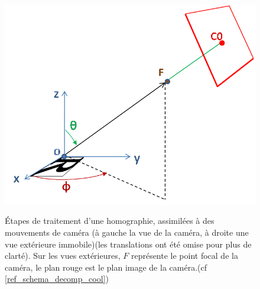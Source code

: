 \begin{figure}
{		{\includegraphics[scale=0.5]{vue_tps_hom_part.png}}}\\
		\caption{Étapes de traitement d'une homographie, assimilées à des mouvements de caméra (à gauche la vue de la caméra, à droite une vue extérieure immobile)(les translations ont été omise pour plus de clarté). Sur les vues extérieures, $F$ représente le point focal de la caméra, le plan rouge est le plan image de la caméra.(cf \ref{ref_schema_decomp_cool})}
		\label{schema_decomp_cool}
	\end{figure}
\clearpage
